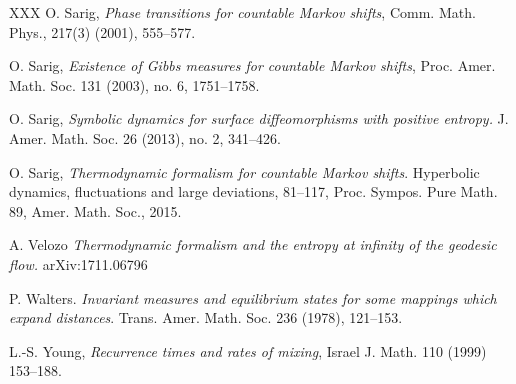 \documentclass[letterpaper,11pt]{amsart}
\theoremstyle{plain}
\theoremstyle{plain}
\theoremstyle{definition}
\theoremstyle{remark}
\begin{document}
\begin{thebibliography}{XXX}
 O. Sarig, \emph{Phase transitions for countable Markov shifts}, Comm. Math. Phys., 217(3) (2001), 555--577.

 O. Sarig, \emph{Existence of Gibbs measures for countable Markov shifts}, Proc. Amer. Math. Soc. 131 (2003), no. 6, 1751--1758.

 O. Sarig,  \emph{Symbolic dynamics for surface diffeomorphisms with positive entropy.} J. Amer. Math. Soc. 26 (2013), no. 2, 341--426.

 O. Sarig, \emph{Thermodynamic formalism for countable Markov shifts}. Hyperbolic dynamics, fluctuations and large deviations, 81--117, Proc. Sympos. Pure Math.  89, Amer. Math. Soc., 2015.



 

  A. Velozo \emph{Thermodynamic formalism and the entropy at infinity of the geodesic flow.} arXiv:1711.06796





 P. Walters. \emph{Invariant measures and equilibrium states for some mappings which expand distances}. Trans. Amer. Math. Soc. 236 (1978), 121--153.

 L.-S. Young, \emph{Recurrence times and rates of mixing}, Israel J. Math. 110 (1999) 153--188.

\end{thebibliography}
\end{document}
